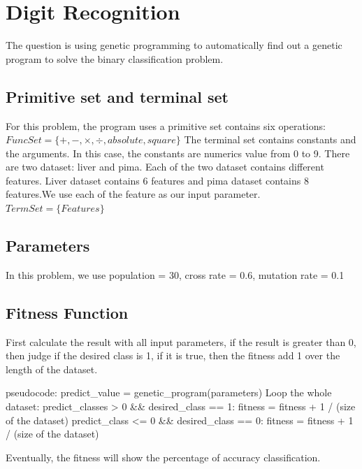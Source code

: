 \documentclass[11pt, a4paper, oneside, openright]{article}
\begin{document}
\section{Digit Recognition}
The  question is using genetic programming to automatically find out a genetic program to solve the binary classification problem.
\subsection{Primitive set and terminal set}
For this problem, the program uses a primitive set contains six operations:
\newline \hspace*{5cm} $FuncSet = \{+, -, \times, \div, absolute, square\}$
\newline The terminal set contains constants and the arguments. In this case, the constants are numerics value from 0 to 9. 
There are two dataset: liver and pima. Each of the two dataset contains different features. Liver dataset contains 6 features and pima dataset contains 8 features.We use each of the feature as our input parameter.
\newline \hspace*{5cm} $TermSet = \{Features\}$
\subsection{Parameters}
In this problem, we use population = 30, cross rate = 0.6, mutation rate = 0.1
\subsection{Fitness Function}
First calculate the result with all input parameters, if the result is greater than 0, then judge  if the desired class is 1, if it is true, then the fitness add 1 over the length of the dataset.
\begin{program}
\mbox{pseudocode:}
\hspace *{3cm} predict\_value = genetic\_program(parameters)
\hspace *{3cm}		Loop \hspace *{2mm}the \hspace *{2mm}whole \hspace *{2mm}dataset:
\hspace *{3cm}			\IF predict\_classes > 0 \hspace *{2mm} \&\& \hspace *{2mm}desired\_class == 1:
\hspace *{3cm}				fitness = fitness + 1 / (size\hspace *{2mm} of \hspace *{2mm}the\hspace *{2mm} dataset)
					\ELSE \IF predict\_class <= 0 \hspace *{2mm}\&\&\hspace *{2mm} desired\_class == 0:
\hspace *{3cm}				fitness = fitness + 1 / (size \hspace *{2mm}of \hspace *{2mm}the \hspace *{2mm}dataset)			
 \\%
\end{program}
Eventually, the fitness will show the percentage of accuracy classification.
\end{document}
